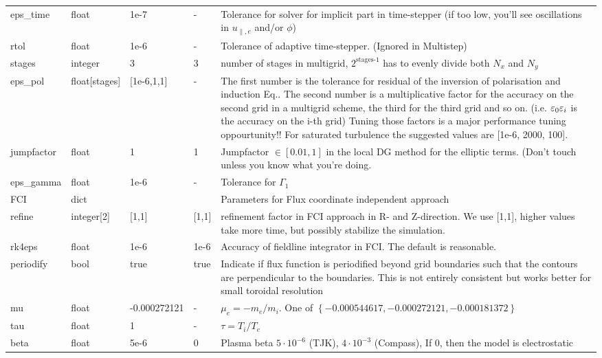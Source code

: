 \begin{longtable}{llllp{6cm}}
\\
eps\_time   & float & 1e-7  & - & Tolerance for solver for implicit part in
time-stepper (if too low, you'll see oscillations in $u_{\parallel,e}$ and/or $\phi$)
\\
rtol  & float &1e-6   & - &Tolerance of adaptive time-stepper. (Ignored in Multistep)
\\
stages      & integer & 3 & 3 & number of stages in multigrid, $2^{\text{stages-1}}$
has to evenly divide both $N_x$ and $N_y$
\\
eps\_pol    & float[stages] & [1e-6,1,1]  & - &  The first number is the tolerance for residual of the inversion of polarisation and induction Eq.. The second number is a multiplicative factor for the accuracy on the second grid in a multigrid scheme, the third for the third grid and so on.  (i.e. $\varepsilon_0\varepsilon_i$ is the accuracy on the i-th grid)
Tuning those factors is a major performance tuning oppourtunity!! For saturated turbulence the suggested values are [1e-6, 2000, 100].
\\
jumpfactor  & float & 1 & 1 & Jumpfactor $\in \left[0.01,1\right]$ in the local DG method for the elliptic terms. (Don't touch unless you know what you're doing.
\\
eps\_gamma  & float & 1e-6  & - & Tolerance for $\Gamma_1$
\\
FCI & dict & & & Parameters for Flux coordinate independent approach
\\
\qquad refine     & integer[2] & [1,1] & [1,1] & refinement factor in FCI approach in R- and Z-direction.
We use [1,1], higher values take more time, but possibly stabilize the simulation.
\\
\qquad rk4eps     & float & 1e-6 & 1e-6 & Accuracy of fieldline integrator in FCI. The default is reasonable.
\\
\qquad periodify & bool & true & true & Indicate if flux function is periodified beyond grid boundaries such that the contours are perpendicular to the boundaries. This is not entirely consistent but works better for small toroidal resolution
\\
mu         & float & -0.000272121& - & $\mu_e =-m_e/m_i$.
    One of $\left\{ -0.000544617, -0.000272121, -0.000181372 \right\}$
\\
tau        & float &1      & - & $\tau = T_i/T_e$
\\
beta       & float & 5e-6  & 0 & Plasma beta $5\cdot 10^{-6}$ (TJK), $4\cdot
10^{-3}$ (Compass), If $0$, then the model is electrostatic
\\

\end{longtable}
